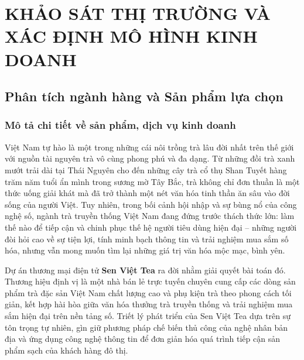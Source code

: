 \chapter{KHẢO SÁT THỊ TRƯỜNG VÀ XÁC ĐỊNH MÔ HÌNH KINH DOANH}

\section{Phân tích ngành hàng và Sản phẩm lựa chọn}

\subsection{Mô tả chi tiết về sản phẩm, dịch vụ kinh doanh}

Việt Nam tự hào là một trong những cái nôi trồng trà lâu đời nhất trên thế giới với nguồn tài nguyên trà vô cùng phong phú và đa dạng. Từ những đồi trà xanh mướt trải dài tại Thái Nguyên cho đến những cây trà cổ thụ Shan Tuyết hàng trăm năm tuổi ẩn mình trong sương mờ Tây Bắc, trà không chỉ đơn thuần là một thức uống giải khát mà đã trở thành một nét văn hóa tinh thần ăn sâu vào đời sống của người Việt. Tuy nhiên, trong bối cảnh hội nhập và sự bùng nổ của công nghệ số, ngành trà truyền thống Việt Nam đang đứng trước thách thức lớn: làm thế nào để tiếp cận và chinh phục thế hệ người tiêu dùng hiện đại – những người đòi hỏi cao về sự tiện lợi, tính minh bạch thông tin và trải nghiệm mua sắm số hóa, nhưng vẫn mong muốn tìm lại những giá trị văn hóa mộc mạc, bình yên.

Dự án thương mại điện tử \textbf{Sen Việt Tea} ra đời nhằm giải quyết bài toán đó. Thương hiệu định vị là một nhà bán lẻ trực tuyến chuyên cung cấp các dòng sản phẩm trà đặc sản Việt Nam chất lượng cao và phụ kiện trà theo phong cách tối giản, kết hợp hài hòa giữa văn hóa thưởng trà truyền thống và trải nghiệm mua sắm hiện đại trên nền tảng số. Triết lý phát triển của Sen Việt Tea dựa trên sự tôn trọng tự nhiên, gìn giữ phương pháp chế biến thủ công của nghệ nhân bản địa và ứng dụng công nghệ thông tin để đơn giản hóa quá trình tiếp cận sản phẩm sạch của khách hàng đô thị.

